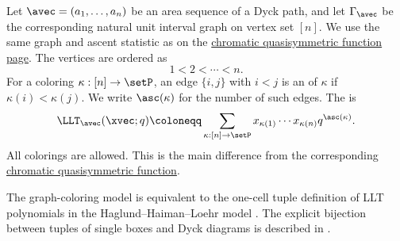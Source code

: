 Let $\avec=(a_1,\dotsc,a_n)$ be an area sequence of a Dyck path, and let
$\Gamma_\avec$ be the corresponding natural unit interval graph on vertex set
$[n]$.  We use the same graph and ascent statistic as on the
\hyperref[chromaticQuasisymmetricDefinition]{chromatic quasisymmetric function
page}.  The vertices are ordered as
\[
1\lt 2\lt \dotsb \lt n.
\]
For a coloring $\kappa:[n]\to \setP$,
an edge $\{i,j\}$ with $i\lt j$ is an
\label{unicellularLLTAscent} of $\kappa$ if
$\kappa(i)\lt\kappa(j)$.
We write $\asc(\kappa)$ for the number of such edges.  The
\label{unicellularLLTGraphPolynomial} is
\[
\LLT_\avec(\xvec;q)
\coloneqq
\sum_{\kappa:[n]\to\setP}
x_{\kappa(1)}\dotsm x_{\kappa(n)}q^{\asc(\kappa)}.
\]
All colorings are allowed.  This is the main difference from the corresponding
\hyperref[chromaticQuasisymmetricDefinition]{chromatic quasisymmetric function}.

The graph-coloring model is equivalent to the one-cell tuple definition of LLT
polynomials in the Haglund--Haiman--Loehr model
\cite{HaglundHaimanLoehr2005}.  The explicit bijection between tuples of
single boxes and Dyck diagrams is described in \cite{AlexanderssonPanova2018}.

